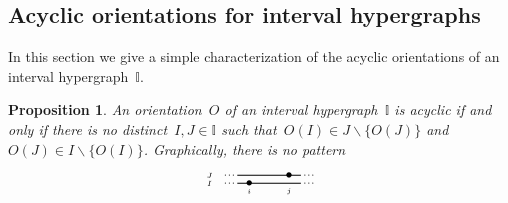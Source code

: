 \documentclass[reqno]{amsart}
\newtheorem{proposition}[theorem]{Proposition}
\theoremstyle{definition}
\newcommand{\I}{\mathbb{I}} %
\newcommand{\ssm}{\smallsetminus} %
\newcommand{\II}{\mathbb I} %
\begin{document}

\subsection{Acyclic orientations for interval hypergraphs}
\label{subsec:acyclicI}

In this section we give a simple characterization of the acyclic orientations of an interval hypergraph~$\II$.

\begin{proposition}
\label{prop:acyclicI}
An orientation~$O$ of an interval hypergraph~$\II$ is acyclic if and only if there is no distinct~$I,J \in \I$ such that~$O(I) \in J \ssm \{O(J)\}$ and~$O(J) \in I \ssm \{O(I)\}$.
Graphically, there is no pattern
 \[
	\begin{tikzpicture}[scale=1,baseline=.0cm]
	\node at (-.5,0.2) {$\scriptscriptstyle J$}; 
	\node at (-.1,0.2) {$\scriptstyle \cdot$};
	\node at (0,0.2) {$\scriptstyle \cdot$};
	\node at (.1,0.2) {$\scriptstyle \cdot$};
	\draw [thick] (.2,.2)--(1.8,.2);
	\node at (1.9,.2) {$\scriptstyle \cdot$};
	\node at (2,.2) {$\scriptstyle \cdot$};
	\node at (2.1,.2) {$\scriptstyle \cdot$};
	\node at (1.5,.2) {$\bullet$};
	\node at (-.5,0) {$\scriptscriptstyle I$};
	\node at (-.1,0) {$\scriptstyle \cdot$};
	\node at (0,0) {$\scriptstyle \cdot$};
	\node at (.1,0) {$\scriptstyle \cdot$};
	\draw [thick] (.2,0)--(1.8,0);
	\node at (1.9,0) {$\scriptstyle \cdot$};
	\node at (2,0) {$\scriptstyle \cdot$};
	\node at (2.1,0) {$\scriptstyle \cdot$};
	\node at (.5,0) {$\bullet$};
	\node at (.5,-.2) {$\scriptscriptstyle i$};
	\node at (1.5,-.2) {$\scriptscriptstyle j$}; 
	\end{tikzpicture}
\]
\end{proposition}
\end{document}
